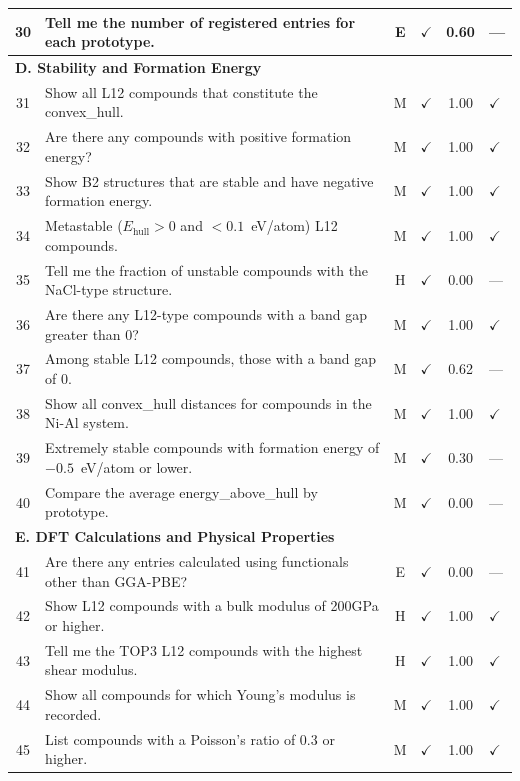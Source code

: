 \documentclass[5p,twocolumn]{elsarticle}
\begin{document}
\begin{longtable}{clcccl}
    30 & Tell me the number of registered entries for each prototype. & E & $\checkmark$ & 0.60 & --- \\
    \midrule
    \multicolumn{6}{l}{\textbf{D. Stability and Formation Energy}} \\
    \midrule
    31 & Show all L12 compounds that constitute the convex\_hull. & M & $\checkmark$ & 1.00 & $\checkmark$ \\
    32 & Are there any compounds with positive formation energy? & M & $\checkmark$ & 1.00 & $\checkmark$ \\
    33 & Show B2 structures that are stable and have negative formation energy. & M & $\checkmark$ & 1.00 & $\checkmark$ \\
    34 & Metastable ($E_\text{hull} > 0$ and $< 0.1$~eV/atom) L12 compounds. & M & $\checkmark$ & 1.00 & $\checkmark$ \\
    35 & Tell me the fraction of unstable compounds with the NaCl-type structure. & H & $\checkmark$ & 0.00 & --- \\
    36 & Are there any L12-type compounds with a band gap greater than 0? & M & $\checkmark$ & 1.00 & $\checkmark$ \\
    37 & Among stable L12 compounds, those with a band gap of 0. & M & $\checkmark$ & 0.62 & --- \\
    38 & Show all convex\_hull distances for compounds in the Ni-Al system. & M & $\checkmark$ & 1.00 & $\checkmark$ \\
    39 & Extremely stable compounds with formation energy of $-0.5$~eV/atom or lower. & M & $\checkmark$ & 0.30 & --- \\
    40 & Compare the average energy\_above\_hull by prototype. & M & $\checkmark$ & 0.00 & --- \\
    \midrule
    \multicolumn{6}{l}{\textbf{E. DFT Calculations and Physical Properties}} \\
    \midrule
    41 & Are there any entries calculated using functionals other than GGA-PBE? & E & $\checkmark$ & 0.00 & --- \\
    42 & Show L12 compounds with a bulk modulus of 200GPa or higher. & H & $\checkmark$ & 1.00 & $\checkmark$ \\
    43 & Tell me the TOP3 L12 compounds with the highest shear modulus. & H & $\checkmark$ & 1.00 & $\checkmark$ \\
    44 & Show all compounds for which Young's modulus is recorded. & M & $\checkmark$ & 1.00 & $\checkmark$ \\
    45 & List compounds with a Poisson's ratio of 0.3 or higher. & M & $\checkmark$ & 1.00 & $\checkmark$ \\

\end{longtable}
\end{document}
